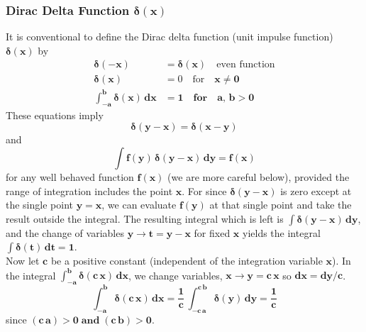 \documentclass[12pt]{article}
\begin{document}
\subsubsection{Dirac Delta Function $\mathbf{\boldsymbol{\delta}(x)}$ } \label{dirac}
It is conventional to define the Dirac delta function (unit impulse function)
  $\mathbf{\boldsymbol{\delta}(x)}$ by
\begin{align}
\mathbf{\boldsymbol{\delta}(-x)} &= \mathbf{\boldsymbol{\delta}(x)} \quad \text{even function} \\
      \mathbf{\boldsymbol{\delta}(x)}  &= 0 \quad \text{for} \quad   \mathbf{x \neq 0} \\
	  \mathbf{\int_{-a}^{b} \boldsymbol{\delta}(x)\,dx} &= \mathbf{1 \quad \text{for} \quad 
              a,\,b > 0 } 	    
\end{align}
These equations imply
\begin{equation}
\mathbf{\boldsymbol{\delta}(y-x) = \boldsymbol{\delta}(x-y)}
\end{equation}
and
\begin{equation}  \label{Eq:delta0}
  \mathbf{\int f(y)\,\boldsymbol{\delta}(y-x)\,dy = f(x) }
\end{equation}
for any well behaved function $\mathbf{f(x)}$ (we are more careful below), 
  provided the range of integration includes the point $\mathbf{x}$.
For since $\mathbf{\boldsymbol{\delta}(y-x)}$ is zero except at the single point $\mathbf{y=x}$, 
  we can evaluate $\mathbf{f(y)}$ at that single point and take the result outside the integral.
The resulting integral which is left is $\mathbf{\int \boldsymbol{\delta}(y-x) \, dy }$, and the
  change of variables $\mathbf{y \rightarrow t = y - x }$ for fixed $\mathbf{x}$ yields the
  integral $\mathbf{\int \boldsymbol{\delta}(t)\,dt = 1 }$.\\
  
\noindent Now let $\mathbf{c}$ be a positive constant (independent of the integration variable $\mathbf{x}$).
In the integral $\mathbf{\int_{-a}^{b} \boldsymbol{\delta}(c\,x) \,dx}$, we change variables,
  $\mathbf{x \rightarrow y = c\,x}$ so $\mathbf{dx = dy/c}$.
\begin{equation} 
\mathbf{\int_{-a}^{b} \boldsymbol{\delta}(c\,x) \,dx = 
   \frac{1}{c} \,  \int_{-c\,a}^{c\,b} \boldsymbol{\delta}(y) \,dy = \frac{1}{c} }
\end{equation}
since $\mathbf{(c\,a) > 0 \; \text{and} \; (c\,b) > 0}$.\\
\end{document}
